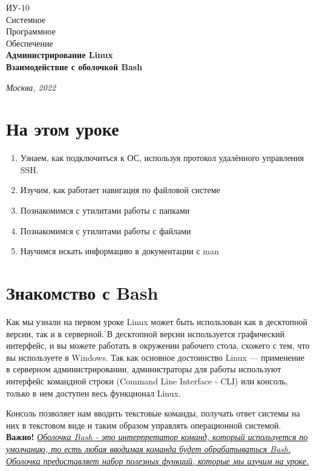 \documentclass[14pt, a4paper]{article}
\begin{document}
\begin{titlepage}
    \topmargin=216pt
    \newpage
    \hangindent=0.7cm
    \huge ИУ-10\\
    Системное\\
    Программное\\
    Обеспечение\\
    \textbf{Администрирование Linux\\ 
    Взаимодействие с оболочкой Bash}

    \vspace{10cm}

    \begin{center}
        \small\textit{Москва, 2022}
    \end{center}
\end{titlepage}
\section*{На этом уроке}
\begin{enumerate}
    \item Узнаем, как подключиться к ОС, используя протокол удалённого управления SSH.
    \item Изучим, как работает навигация по файловой системе
    \item Познакомимся с утилитами работы с папками
    \item Познакомимся с утилитами работы с файлами
    \item Научимся искать информацию в документации с man
\end{enumerate}
\tableofcontents
\newpage



\section*{Знакомство с Bash}


Как мы узнали на первом уроке Linux может быть использован как в десктопной версии, так и в
серверной. В десктопной версии используется графический интерфейс, и вы можете работать в
окружении рабочего стола, схожего с тем, что вы используете в Windows. Так как основное
достоинство Linux — применение в серверном администрировании, администраторы для работы
используют интерфейс командной строки (Command Line Interface - CLI) или консоль, только в нем
доступен весь функционал Linux.

Консоль позволяет нам вводить текстовые команды, получать ответ системы на них в
текстовом виде и таким образом управлять операционной системой. \textbf{Важно!} \textit{\uline{Оболочка Bash - это
интерпретатор команд, который используется по умолчанию, то есть любая вводимая команда
будет обрабатываться Bash. Оболочка предоставляет набор полезных функций, которые мы
изучим на уроке.}}
\end{document}

